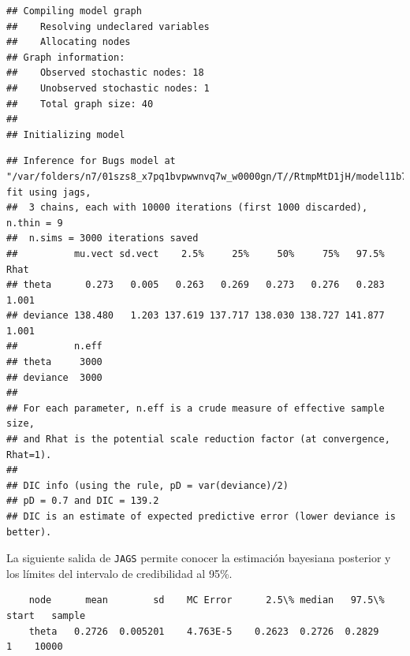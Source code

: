 \begin{Eje}
\begin{knitrout}
\begin{kframe}
\begin{alltt}
 \hlkwb{<-} \hlstd{(}\hlstd{,}\hlstd{,}\hlstd{)}
 \hlkwb{<-} \hlstd{(}\hlstd{)}
 \hlkwb{<-} \hlstd{()\{}
\hlstd{(}\hlstd{=}\hlstd{(}\hlstd{))}
\hlstd{\}}

 \hlkwb{<-} \hlstd{(}  \hlstd{=}\hlstd{,} \hlstd{=}\hlstd{,} 
\end{alltt}


{\ttfamily\noindent\itshape\color{messagecolor}{\#\# module glm loaded}}\begin{verbatim}
## Compiling model graph
##    Resolving undeclared variables
##    Allocating nodes
## Graph information:
##    Observed stochastic nodes: 18
##    Unobserved stochastic nodes: 1
##    Total graph size: 40
## 
## Initializing model
\end{verbatim}
\begin{alltt}
\end{alltt}
\begin{verbatim}
## Inference for Bugs model at "/var/folders/n7/01szs8_x7pq1bvpwwnvq7w_w0000gn/T//RtmpMtD1jH/model11b7508fed7.txt", fit using jags,
##  3 chains, each with 10000 iterations (first 1000 discarded), n.thin = 9
##  n.sims = 3000 iterations saved
##          mu.vect sd.vect    2.5%     25%     50%     75%   97.5%  Rhat
## theta      0.273   0.005   0.263   0.269   0.273   0.276   0.283 1.001
## deviance 138.480   1.203 137.619 137.717 138.030 138.727 141.877 1.001
##          n.eff
## theta     3000
## deviance  3000
## 
## For each parameter, n.eff is a crude measure of effective sample size,
## and Rhat is the potential scale reduction factor (at convergence, Rhat=1).
## 
## DIC info (using the rule, pD = var(deviance)/2)
## pD = 0.7 and DIC = 139.2
## DIC is an estimate of expected predictive error (lower deviance is better).
\end{verbatim}
\end{kframe}
\end{knitrout}
    
    La siguiente salida de \texttt{JAGS} permite conocer la estimaci\'on bayesiana posterior y los l\'imites del intervalo de credibilidad al 95\%.
    
    \begin{verbatim}
    node	  mean	      sd    MC Error	  2.5\%	median	 97.5\%	start	sample
    theta	0.2726	0.005201	4.763E-5	0.2623	0.2726	0.2829	    1	 10000
    \end{verbatim}
    

\end{Eje}
